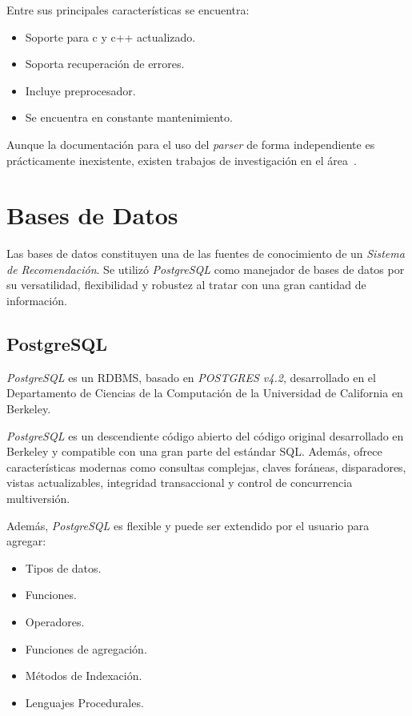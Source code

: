 Entre sus principales características se encuentra:

\begin{itemize}
  \item Soporte para c y c++ actualizado.
  \item Soporta recuperación de errores.
  \item Incluye preprocesador.
  \item Se encuentra en constante mantenimiento.
\end{itemize}

Aunque la documentación para el uso del \textit{parser} de forma independiente es prácticamente inexistente,
existen trabajos de investigación en el área~\cite{10.1007/978-3-642-33442-9_45}.

\section{Bases de Datos}
\label{sec:db}

Las bases de datos constituyen una de las fuentes de conocimiento de un \textit{Sistema de Recomendación}.
Se utilizó \textit{PostgreSQL} como manejador de bases de datos por su versatilidad,
flexibilidad y robustez al tratar con una gran cantidad de información.

\subsection{PostgreSQL}

\textit{PostgreSQL} es un \ac{RDBMS}, basado en \textit{POSTGRES v4.2},
desarrollado en el Departamento de Ciencias de la Computación de la
Universidad de California en Berkeley.

\textit{PostgreSQL} es un descendiente código abierto del código original
desarrollado en Berkeley y compatible con una gran parte del estándar \ac{SQL}.
Además, ofrece características modernas como consultas complejas,
claves foráneas, disparadores, vistas actualizables, integridad
transaccional y control de concurrencia multiversión.

Además, \textit{PostgreSQL} es flexible y puede ser extendido por el usuario para agregar:

\begin{itemize}
  \item Tipos de datos.
  \item Funciones.
  \item Operadores.
  \item Funciones de agregación.
  \item Métodos de Indexación.
  \item Lenguajes Procedurales.
\end{itemize}


